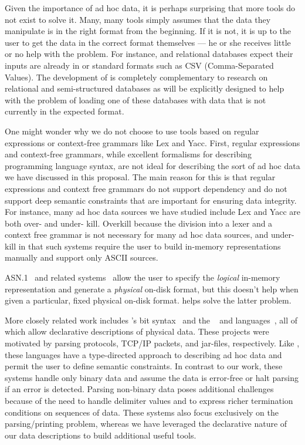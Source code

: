 \documentclass[11pt]{article}
\begin{document}
Given the importance of ad hoc data, it is perhaps surprising that
more tools do not exist to solve it.  Many, many tools simply assumes
that the data they manipulate is in the right format from the
beginning.  If it is not, it is up to the user to get the data in the
correct format themselves --- he or she receives little or no help
with the problem. For instance, \xml{} and relational databases expect
their inputs are already in \xml{} or standard formats such as CSV
(Comma-Separated Values).  The development of \datatype{} is
completely complementary to research on relational and semi-structured
databases as \datatype will be explicitly designed to help with the
problem of loading one of these databases with data that is not
currently in the expected format.

One might wonder why we do not choose to use tools based on
regular expressions or context-free grammars like Lex and Yacc.
First, regular expressions and context-free grammars, while excellent
formalisms for describing programming language syntax, are not ideal
for describing the sort of ad hoc data we have discussed in this proposal.
The main reason for this is that regular expressions and context free grammars
do not support dependency and do not support deep semantic constraints
that are important for ensuring data integrity.
For instance, many ad hoc data sources we have studied include 
Lex and Yacc are
both over- and under- kill.  Overkill because the division into a
lexer and a context free grammar is not necessary for many ad hoc data
sources, and under-kill in that such systems require the user to build
in-memory representations manually and support only ASCII sources.  

ASN.1~\cite{asn} and related
systems~\cite{asdl} allow the user to specify the {\em logical} in-memory
representation and generate a {\em physical} on-disk format, 
but this doesn't help when given a particular, fixed physical 
on-disk format.  \datatype{} helps solve the latter problem.

More closely related work includes \erlang{}'s bit syntax~\cite{erlang} and
the \packettypes{}~\cite{sigcomm00} and
\datascript{} languages~\cite{gpce02}, 
all of which allow declarative descriptions of physical data.  These projects were motivated by parsing protocols,
\textsc{TCP/IP} packets, and \java{} jar-files, respectively.  Like
\pads{}, these languages have a type-directed approach to
describing ad hoc data and permit the user to define semantic constraints.
In contrast to our
work, these systems handle only binary data and assume the data is
error-free or halt parsing if an error is detected. 
Parsing non-binary data poses additional challenges because of the need
to handle delimiter values and to express richer termination conditions
on sequences of data. These systems also
focus exclusively on the parsing/printing problem, whereas we have 
leveraged the declarative nature of
our data descriptions to build additional useful tools.
\end{document}
